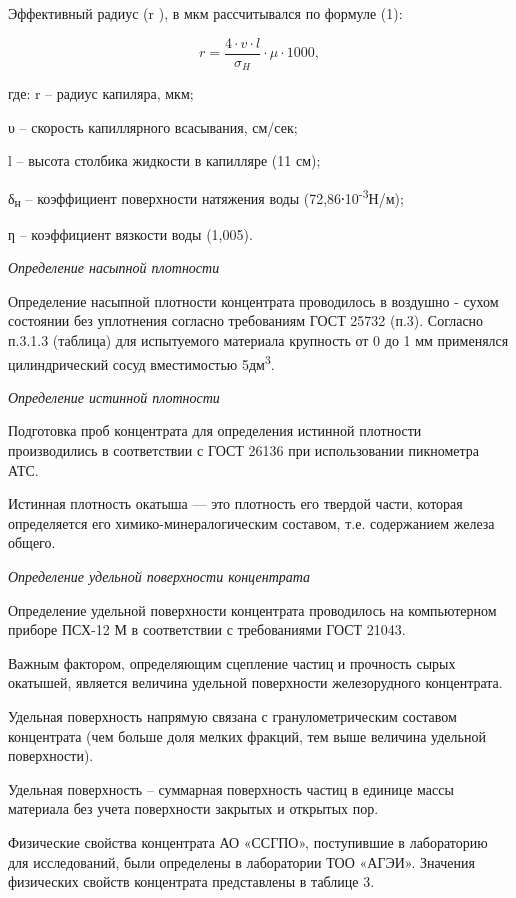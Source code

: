 \begin{multicols}{2}
Эффективный радиус (r ), в мкм рассчитывался по формуле (1):

\begin{equation}
r=\frac{4\cdot v\cdot l}{\sigma_H}\cdot \mu\cdot 1000,
\end{equation}

где: r -- радиус капиляра, мкм;

υ -- скорость капиллярного всасывания, см/сек;

l -- высота столбика жидкости в капилляре (11 см);

δ\textsubscript{н} -- коэффициент поверхности натяжения воды
(72,86⸱10\textsuperscript{-3}Н/м);

ƞ -- коэффициент вязкости воды (1,005).

\emph{Определение насыпной плотности}

Определение насыпной плотности концентрата проводилось в воздушно -
сухом состоянии без уплотнения согласно требованиям ГОСТ 25732 (п.3).
Согласно п.3.1.3 (таблица) для испытуемого материала крупность от 0 до 1
мм применялся цилиндрический сосуд вместимостью 5дм\textsuperscript{3}.

\emph{Определение истинной плотности}

Подготовка проб концентрата для определения истинной плотности
производились в соответствии с ГОСТ 26136 при использовании пикнометра
АТС.

Истинная плотность окатыша --- это плотность его твердой части, которая
определяется его химико-минералогическим составом, т.е. содержанием
железа общего.

\emph{Определение удельной поверхности концентрата}

Определение удельной поверхности концентрата проводилось на компьютерном
приборе ПСХ-12 М в соответствии с требованиями ГОСТ 21043.

Важным фактором, определяющим сцепление частиц и прочность сырых
окатышей, является величина удельной поверхности железорудного
концентрата.

Удельная поверхность напрямую связана с гранулометрическим составом
концентрата (чем больше доля мелких фракций, тем выше величина удельной
поверхности).

Удельная поверхность -- суммарная поверхность частиц в единице массы
материала без учета поверхности закрытых и открытых пор.

Физические свойства концентрата АО «ССГПО», поступившие в лабораторию
для исследований, были определены в лаборатории ТОО «АГЭИ». Значения
физических свойств концентрата представлены в таблице 3.
\end{multicols}

